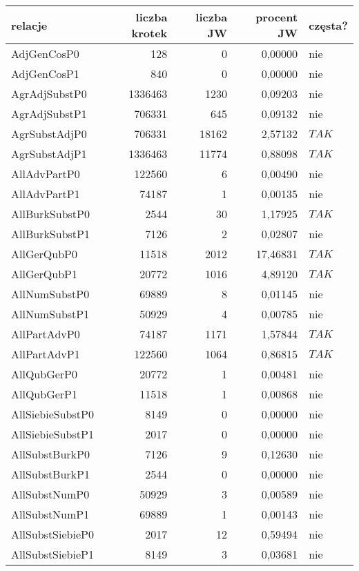 \begin{table}[h!]
\centering
\footnotesize\setlength{\tabcolsep}{2.5pt}
\begin{tabular}{ l | r | r | r | l }
	\toprule
	\textbf{relacje} 	& \textbf{liczba krotek} & \textbf{liczba JW} & \textbf{procent JW} & \textbf{częsta?} 	\\
	\midrule
	AdjGenCosP0	&	128	&	0	&	0,00000	&	nie	\\
	AdjGenCosP1	&	840	&	0	&	0,00000	&	nie	\\
	AgrAdjSubstP0	&	1336463	&	1230	&	0,09203	&	nie	\\
	AgrAdjSubstP1	&	706331	&	645	&	0,09132	&	nie	\\
	AgrSubstAdjP0	&	706331	&	18162	&	2,57132	&	$ TAK $	\\
	AgrSubstAdjP1	&	1336463	&	11774	&	0,88098	&	$ TAK $	\\
	AllAdvPartP0	&	122560	&	6	&	0,00490	&	nie	\\
	AllAdvPartP1	&	74187	&	1	&	0,00135	&	nie	\\
	AllBurkSubstP0	&	2544	&	30	&	1,17925	&	$ TAK $	\\
	AllBurkSubstP1	&	7126	&	2	&	0,02807	&	nie	\\
	AllGerQubP0	&	11518	&	2012	&	17,46831	&	$ TAK $	\\
	AllGerQubP1	&	20772	&	1016	&	4,89120	&	$ TAK $	\\
	AllNumSubstP0	&	69889	&	8	&	0,01145	&	nie	\\
	AllNumSubstP1	&	50929	&	4	&	0,00785	&	nie	\\
	AllPartAdvP0	&	74187	&	1171	&	1,57844	&	$ TAK $	\\
	AllPartAdvP1	&	122560	&	1064	&	0,86815	&	$ TAK $	\\
	AllQubGerP0	&	20772	&	1	&	0,00481	&	nie	\\
	AllQubGerP1	&	11518	&	1	&	0,00868	&	nie	\\
	AllSiebieSubstP0	&	8149	&	0	&	0,00000	&	nie	\\
	AllSiebieSubstP1	&	2017	&	0	&	0,00000	&	nie	\\
	AllSubstBurkP0	&	7126	&	9	&	0,12630	&	nie	\\
	AllSubstBurkP1	&	2544	&	0	&	0,00000	&	nie	\\
	AllSubstNumP0	&	50929	&	3	&	0,00589	&	nie	\\
	AllSubstNumP1	&	69889	&	1	&	0,00143	&	nie	\\
	AllSubstSiebieP0	&	2017	&	12	&	0,59494	&	nie	\\
	AllSubstSiebieP1	&	8149	&	3	&	0,03681	&	nie	\\

\end{tabular}
\end{table}
